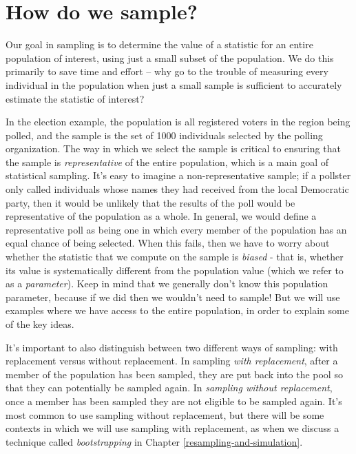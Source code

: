 \documentclass[
  12pt,
]{book}
\begin{document}
\hypertarget{how-do-we-sample}{%
\section{How do we sample?}\label{how-do-we-sample}}

Our goal in sampling is to determine the value of a statistic for an entire population of interest, using just a small subset of the population. We do this primarily to save time and effort -- why go to the trouble of measuring every individual in the population when just a small sample is sufficient to accurately estimate the statistic of interest?

In the election example, the population is all registered voters in the region being polled, and the sample is the set of 1000 individuals selected by the polling organization. The way in which we select the sample is critical to ensuring that the sample is \emph{representative} of the entire population, which is a main goal of statistical sampling. It's easy to imagine a non-representative sample; if a pollster only called individuals whose names they had received from the local Democratic party, then it would be unlikely that the results of the poll would be representative of the population as a whole. In general, we would define a representative poll as being one in which every member of the population has an equal chance of being selected. When this fails, then we have to worry about whether the statistic that we compute on the sample is \emph{biased} - that is, whether its value is systematically different from the population value (which we refer to as a \emph{parameter}). Keep in mind that we generally don't know this population parameter, because if we did then we wouldn't need to sample! But we will use examples where we have access to the entire population, in order to explain some of the key ideas.

It's important to also distinguish between two different ways of sampling: with replacement versus without replacement. In sampling \emph{with replacement}, after a member of the population has been sampled, they are put back into the pool so that they can potentially be sampled again. In \emph{sampling without replacement}, once a member has been sampled they are not eligible to be sampled again. It's most common to use sampling without replacement, but there will be some contexts in which we will use sampling with replacement, as when we discuss a technique called \emph{bootstrapping} in Chapter \ref{resampling-and-simulation}.
\end{document}
